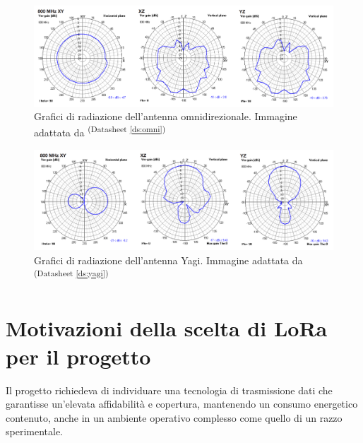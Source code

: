 \documentclass[12pt,a4paper,twoside]{book}
\newcommand{\dsref}[1]{\textsuperscript{(Datasheet \ref{#1})}}
\begin{document}
\begin{figure}[H]
    \centering
    \includegraphics[width=\textwidth]{img/omnidirezionale-rad-plot.png}
    \caption[Grafici di radiazione antenna omnidirezionale]%
    {Grafici di radiazione dell'antenna omnidirezionale. \tiny{Immagine adattata da \dsref{ds:omni}}}%
    \label{fig:omni-rad-plot}
\end{figure}

\begin{figure}[H]
    \centering
    \includegraphics[width=\textwidth]{img/yagi-rad-plot.png}
    \caption[Grafici di radiazione dell'antenna Yagi]%
    {Grafici di radiazione dell'antenna Yagi. \tiny{Immagine adattata da \dsref{ds:yagi}}}%
    \label{fig:yagi-rad-plot}
\end{figure}

\section{Motivazioni della scelta di \texorpdfstring{LoRa\textsuperscript{\textcopyright}}{} per il progetto}
Il progetto richiedeva di individuare una tecnologia di trasmissione dati che garantisse
un'elevata affidabilità e copertura, mantenendo un consumo energetico contenuto,
anche in un ambiente operativo complesso come quello di un razzo sperimentale.
\end{document}

